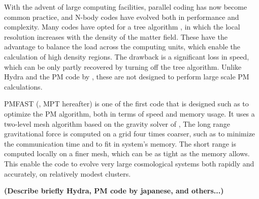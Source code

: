 With the advent of large computing facilities, parallel coding has now become common practice, 
and N-body codes have evolved both in performance and complexity. 
Many codes have opted for a tree algorithm \citep{Gadjet, Gadjet2, TPM, GOTPM}, in which 
the local resolution increases with the density of the matter field. 
These have the advantage to balance the load across the computing units, which enable the calculation of high density regions. 
The drawback is a significant loss in speed, which can be only partly recovered by turning off the tree algorithm. 
Unlike Hydra \citep{couchman1991} and the PM code by \cite{FerrelBertschinger1995},
 these are not designed to perform large scale PM calculations. 

{\small PMFAST} (\cite{PMFAST}, MPT hereafter) is one of the first code that is designed such as to optimize the PM algorithm,
both in terms of speed and memory usage. It uses a two-level mesh algorithm based on the gravity solver of \cite{TracPen2003},
The long range gravitational force is computed on a  grid four times coarser, such as to minimize the communication time
and to fit in system's memory. The short range is computed locally on a finer mesh, which can be as tight as the memory allows.
This enable the code to evolve very large cosmological systems both rapidly and accurately, on relatively modest clusters.




{\bf (Describe briefly   Hydra, PM code by japanese, and others...)}








